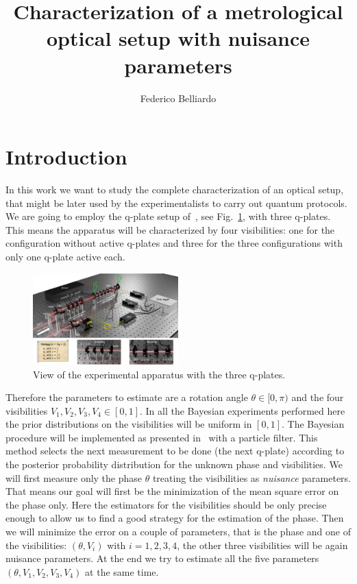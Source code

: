 \documentclass[aps, pra, 10pt, twocolumn, superscriptaddress,floatfix]{revtex4-1}
\begin{document}
%
\title{Characterization of a metrological optical setup with nuisance parameters} 
%
\author{Federico Belliardo}

\maketitle


\section{Introduction}
%
In this work we want to study the complete characterization of an optical setup, that might be later used by the experimentalists to carry out quantum protocols. We are going to employ the q-plate setup of~\cite{Cimini2021}, see Fig.~\ref{fig:apparatus}, with three q-plates. This means the apparatus will be characterized by four visibilities: one for the configuration without active q-plates and three for the three configurations with only one q-plate active each. 
%
\begin{figure}[!th]
	\begin{center}
		\includegraphics[width=0.5\textwidth]{FigureSetup.pdf}
	\end{center}
	\caption{View of the experimental apparatus with the three q-plates.}
	\label{fig:apparatus}
\end{figure}
%
Therefore the parameters to estimate are a rotation angle $\theta \in [0, \pi)$ and the four visibilities $V_1, V_2, V_3, V_4 \in [0, 1]$. In all the Bayesian experiments performed here the prior distributions on the visibilities will be uniform in $[0, 1]$. The Bayesian procedure will be implemented as presented in~\cite{Granade2012} with a particle filter. This method selects the next measurement to be done (the next q-plate) according to the posterior probability distribution for the unknown phase and visibilities. We will first measure only the phase $\theta$ treating the visibilities as \textit{nuisance} parameters. That means our goal will first be the minimization of the mean square error on the phase only. Here the estimators for the visibilities should be only precise enough to allow us to find a good strategy for the estimation of the phase. Then we will minimize the error on a couple of parameters, that is the phase and one of the visibilities: $(\theta, V_i)$ with $i=1, 2, 3, 4$, the other three visibilities will be again nuisance parameters. At the end we try to estimate all the five parameters $(\theta, V_1, V_2, V_3, V_4)$ at the same time. 
\end{document}
